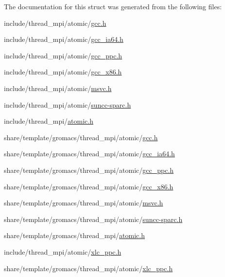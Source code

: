 \-The documentation for this struct was generated from the following files\-:\begin{DoxyCompactItemize}
\item 
include/thread\-\_\-mpi/atomic/\hyperlink{include_2thread__mpi_2atomic_2gcc_8h}{gcc.\-h}\item 
include/thread\-\_\-mpi/atomic/\hyperlink{include_2thread__mpi_2atomic_2gcc__ia64_8h}{gcc\-\_\-ia64.\-h}\item 
include/thread\-\_\-mpi/atomic/\hyperlink{include_2thread__mpi_2atomic_2gcc__ppc_8h}{gcc\-\_\-ppc.\-h}\item 
include/thread\-\_\-mpi/atomic/\hyperlink{include_2thread__mpi_2atomic_2gcc__x86_8h}{gcc\-\_\-x86.\-h}\item 
include/thread\-\_\-mpi/atomic/\hyperlink{include_2thread__mpi_2atomic_2msvc_8h}{msvc.\-h}\item 
include/thread\-\_\-mpi/atomic/\hyperlink{include_2thread__mpi_2atomic_2suncc-sparc_8h}{suncc-\/sparc.\-h}\item 
include/thread\-\_\-mpi/\hyperlink{include_2thread__mpi_2atomic_8h}{atomic.\-h}\item 
share/template/gromacs/thread\-\_\-mpi/atomic/\hyperlink{share_2template_2gromacs_2thread__mpi_2atomic_2gcc_8h}{gcc.\-h}\item 
share/template/gromacs/thread\-\_\-mpi/atomic/\hyperlink{share_2template_2gromacs_2thread__mpi_2atomic_2gcc__ia64_8h}{gcc\-\_\-ia64.\-h}\item 
share/template/gromacs/thread\-\_\-mpi/atomic/\hyperlink{share_2template_2gromacs_2thread__mpi_2atomic_2gcc__ppc_8h}{gcc\-\_\-ppc.\-h}\item 
share/template/gromacs/thread\-\_\-mpi/atomic/\hyperlink{share_2template_2gromacs_2thread__mpi_2atomic_2gcc__x86_8h}{gcc\-\_\-x86.\-h}\item 
share/template/gromacs/thread\-\_\-mpi/atomic/\hyperlink{share_2template_2gromacs_2thread__mpi_2atomic_2msvc_8h}{msvc.\-h}\item 
share/template/gromacs/thread\-\_\-mpi/atomic/\hyperlink{share_2template_2gromacs_2thread__mpi_2atomic_2suncc-sparc_8h}{suncc-\/sparc.\-h}\item 
share/template/gromacs/thread\-\_\-mpi/\hyperlink{share_2template_2gromacs_2thread__mpi_2atomic_8h}{atomic.\-h}\item 
include/thread\-\_\-mpi/atomic/\hyperlink{include_2thread__mpi_2atomic_2xlc__ppc_8h}{xlc\-\_\-ppc.\-h}\item 
share/template/gromacs/thread\-\_\-mpi/atomic/\hyperlink{share_2template_2gromacs_2thread__mpi_2atomic_2xlc__ppc_8h}{xlc\-\_\-ppc.\-h}\end{DoxyCompactItemize}
